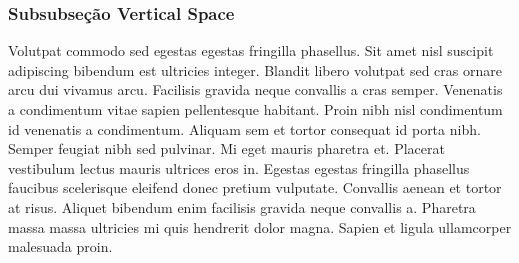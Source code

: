 \documentclass[12pt]{article}
\begin{document}
	\subsubsection{Subsubseção Vertical Space}
		\vspace{1.5cm} %
		Volutpat commodo sed egestas egestas fringilla phasellus. Sit amet nisl suscipit adipiscing bibendum est ultricies integer. Blandit libero volutpat sed cras ornare arcu dui vivamus arcu. Facilisis gravida neque convallis a cras semper. Venenatis a condimentum vitae sapien pellentesque habitant. Proin nibh nisl condimentum id venenatis a condimentum. Aliquam sem et tortor consequat id porta nibh. Semper feugiat nibh sed pulvinar. Mi eget mauris pharetra et. \vspace{1cm}Placerat vestibulum lectus mauris ultrices eros in. Egestas egestas fringilla phasellus faucibus scelerisque eleifend donec pretium vulputate. Convallis aenean et tortor at risus. Aliquet bibendum enim facilisis gravida neque convallis a. Pharetra massa massa ultricies mi quis hendrerit dolor magna. Sapien et ligula ullamcorper malesuada proin.
		
	
	
\end{document}
